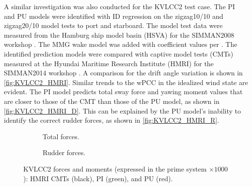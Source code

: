 A similar investigation was also conducted for the KVLCC2 test case. The PI and PU models were identified with ID regression on the zigzag10/10 and zigzag20/10 model tests to port and starboard. The model test data were measured from the Hamburg ship model basin (HSVA) for the SIMMAN2008 workshop \citep{stern_experience_2011}.
The MMG wake model was added with coefficient values per \citet{yasukawa_introduction_2015}.
The identified prediction models were compared with captive model tests (CMTs) measured at the Hyundai Maritime Research Institute (HMRI) for the SIMMAN2014 workshop \citep{ittc_final_2017}. A comparison for the drift angle variation is shown in \autoref{fig:KVLCC2_HMRI}. 
Similar trends to the wPCC in the idealized wind state are evident. The PI model predicts total sway force and yawing moment values that are closer to those of the CMT than those of the PU model, as shown in \autoref{fig:KVLCC2_HMRI_D}.
This can be explained by the PU model's inability to identify the correct rudder forces, as shown in \autoref{fig:KVLCC2_HMRI_R}.
%
\begin{figure}
    \centering
    \begin{subfigure}[b]{0.49\textwidth}
        \centering
        
        \caption{Total forces.}
        \label{fig:KVLCC2_HMRI_D}
    \end{subfigure}
    \hfill
    \begin{subfigure}[b]{0.49\textwidth}
        \centering
        
        \caption{Rudder forces.}
        \label{fig:KVLCC2_HMRI_R}
    \end{subfigure}
    \caption{KVLCC2 forces and moments (expressed in the prime system $\times 1000$): HMRI CMTs (black), PI (green), and PU (red).}
    \label{fig:KVLCC2_HMRI}
\end{figure}